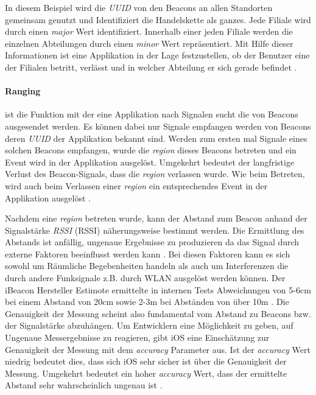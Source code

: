 In diesem Beispiel wird die \textit{\acs{UUID}} von den Beacons an allen Standorten gemeinsam genutzt und Identifiziert die Handelskette als ganzes. Jede Filiale wird durch einen \textit{major} Wert identifiziert. Innerhalb einer jeden Filiale werden die einzelnen Abteilungen durch einen \textit{minor} Wert repräsentiert. Mit Hilfe dieser Informationen ist eine Applikation in der Lage festzustellen, ob der Benutzer eine der Filialen betritt, verlässt und in welcher Abteilung er sich gerade befindet \cite{iBeacon:2014}.

\paragraph{Ranging}
ist die Funktion mit der eine Applikation nach Signalen sucht die von Beacons ausgesendet werden. Es können dabei nur Signale empfangen werden von Beacons deren \textit{\acs{UUID}} der Applikation bekannt sind. Werden zum ersten mal Signale eines solchen Beacons empfangen, wurde die \textit{region} dieses Beacons betreten und ein Event wird in der Applikation ausgelöst. Umgekehrt bedeutet der langfristige Verlust des Beacon-Signals, dass die \textit{region} verlassen wurde. Wie beim Betreten, wird auch beim Verlassen einer \textit{region} ein entsprechendes Event in der Applikation ausgelöst \cite{iBeacon:2014}.

Nachdem eine \textit{region} betreten wurde, kann der Abstand zum Beacon anhand der Signalstärke \textit{\acs{RSSI}} (\acl{RSSI}) näherungsweise bestimmt werden. Die Ermittlung des Abstands ist anfällig, ungenaue Ergebnisse zu produzieren da das Signal durch externe Faktoren beeinflusst werden kann \cite{EstimoteBeaconSignal:Online}. Bei diesen Faktoren kann es sich sowohl um Räumliche Begebenheiten handeln als auch um Interferenzen die durch andere Funksignale z.B. durch WLAN ausgelöst werden können. Der iBeacon Hersteller Estimote ermittelte in internen Tests Abweichungen von 5-6cm bei einem Abstand von 20cm sowie 2-3m bei Abständen von über 10m \cite{EstimoteBeaconSignal:Online}. Die Genauigkeit der Messung scheint also fundamental vom Abstand zu Beacons bzw.  der Signalstärke abzuhängen. Um Entwicklern eine Möglichkeit zu geben, auf Ungenaue Messergebnisse zu reagieren, gibt \acs{iOS} eine Einschätzung zur Genauigkeit der Messung mit dem \textit{accuracy} Parameter aus. Ist der \textit{accuracy} Wert niedrig bedeutet dies, dass sich \acs{iOS} sehr sicher ist über die Genauigkeit der Messung. Umgekehrt bedeutet ein hoher \textit{accuracy} Wert, dass der ermittelte Abstand sehr wahrscheinlich ungenau ist \cite{iBeacon:2014}.

